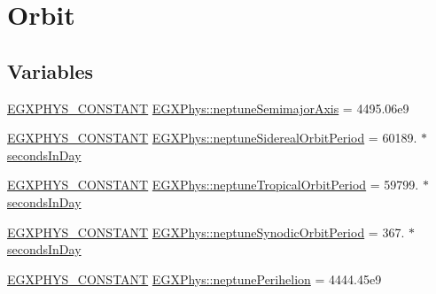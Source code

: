 \hypertarget{group___e_g_x_phys-_constants-_astrophysics-_solar_system-_neptune-_orbit}{}\section{Orbit}
\label{group___e_g_x_phys-_constants-_astrophysics-_solar_system-_neptune-_orbit}
\subsection*{Variables}
\begin{DoxyCompactItemize}
\item 
\mbox{\hyperlink{group___e_g_x_phys-_constants-_macros_ga76980d288494ce1714c9ac68a95ba702}{E\+G\+X\+P\+H\+Y\+S\+\_\+\+C\+O\+N\+S\+T\+A\+NT}} \mbox{\hyperlink{group___e_g_x_phys-_constants-_astrophysics-_solar_system-_neptune-_orbit_ga3bf40ceee0e50ac1d2f5c5a56ce9df83}{E\+G\+X\+Phys\+::neptune\+Semimajor\+Axis}} = 4495.\+06e9
\item 
\mbox{\hyperlink{group___e_g_x_phys-_constants-_macros_ga76980d288494ce1714c9ac68a95ba702}{E\+G\+X\+P\+H\+Y\+S\+\_\+\+C\+O\+N\+S\+T\+A\+NT}} \mbox{\hyperlink{group___e_g_x_phys-_constants-_astrophysics-_solar_system-_neptune-_orbit_gab23659c64bba74a4f087c736d57663ee}{E\+G\+X\+Phys\+::neptune\+Sidereal\+Orbit\+Period}} = 60189. $\ast$\mbox{\hyperlink{namespace_e_g_x_phys_a93d2a00d75411b58cbf63ab3fd1f8bc2}{seconds\+In\+Day}}
\item 
\mbox{\hyperlink{group___e_g_x_phys-_constants-_macros_ga76980d288494ce1714c9ac68a95ba702}{E\+G\+X\+P\+H\+Y\+S\+\_\+\+C\+O\+N\+S\+T\+A\+NT}} \mbox{\hyperlink{group___e_g_x_phys-_constants-_astrophysics-_solar_system-_neptune-_orbit_gad68a2114ccb061c79cee84aafeaa8a35}{E\+G\+X\+Phys\+::neptune\+Tropical\+Orbit\+Period}} = 59799. $\ast$\mbox{\hyperlink{namespace_e_g_x_phys_a93d2a00d75411b58cbf63ab3fd1f8bc2}{seconds\+In\+Day}}
\item 
\mbox{\hyperlink{group___e_g_x_phys-_constants-_macros_ga76980d288494ce1714c9ac68a95ba702}{E\+G\+X\+P\+H\+Y\+S\+\_\+\+C\+O\+N\+S\+T\+A\+NT}} \mbox{\hyperlink{group___e_g_x_phys-_constants-_astrophysics-_solar_system-_neptune-_orbit_ga2d54203662fda436f2aec854aa414896}{E\+G\+X\+Phys\+::neptune\+Synodic\+Orbit\+Period}} = 367. $\ast$\mbox{\hyperlink{namespace_e_g_x_phys_a93d2a00d75411b58cbf63ab3fd1f8bc2}{seconds\+In\+Day}}
\item 
\mbox{\hyperlink{group___e_g_x_phys-_constants-_macros_ga76980d288494ce1714c9ac68a95ba702}{E\+G\+X\+P\+H\+Y\+S\+\_\+\+C\+O\+N\+S\+T\+A\+NT}} \mbox{\hyperlink{group___e_g_x_phys-_constants-_astrophysics-_solar_system-_neptune-_orbit_ga17079b562c5aa57a9506bd34c9864b02}{E\+G\+X\+Phys\+::neptune\+Perihelion}} = 4444.\+45e9

\end{DoxyCompactItemize}

